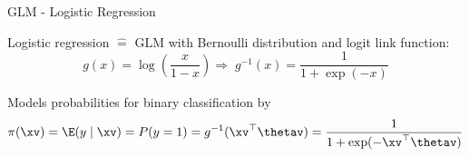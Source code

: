 \documentclass[10pt,compress,t,notes=noshow, xcolor=table]{beamer}
\begin{document}
\begin{framev}[align=top]{GLM - Logistic Regression}
\begin{itemizeM}
\item Logistic regression $\hat{=}$ GLM with Bernoulli distribution and logit link function:
$$
g(x) = \log\left(\frac{x}{1 - x}\right)
\Rightarrow \; g^{-1}(x) = \frac{1}{1 + \exp(-x)}
$$
\item Models probabilities for binary classification by
$$\pi(\xv) = \E(y \mid \xv) = P(y = 1) = g^{-1}(\xv^\top \thetav) = \frac{1}{1 + \exp(-\xv^\top \thetav)}$$
\end{itemizeM}
\centering
{}
\qquad
{}
\end{framev}
\end{document}
